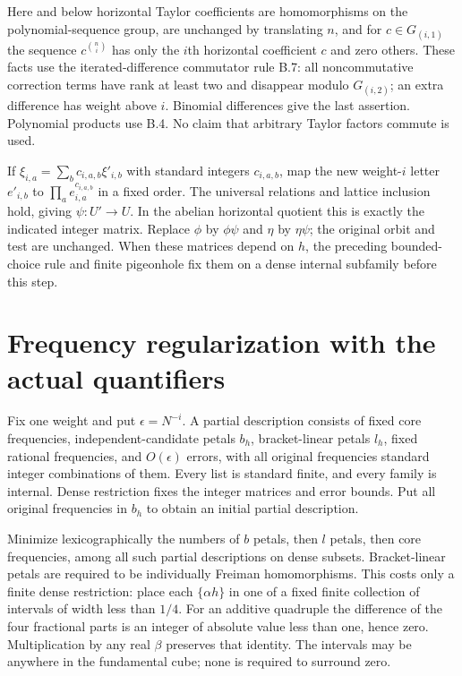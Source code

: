 \documentclass[11pt]{article}
\begin{document}
Here and below horizontal Taylor coefficients are homomorphisms on the
polynomial-sequence group, are unchanged by translating $n$, and for
$c\in G_{(i,1)}$ the sequence $c^{\binom ni}$ has only the $i$th horizontal
coefficient $c$ and zero others. These facts use the iterated-difference
commutator rule B.7: all noncommutative correction terms have rank at least
two and disappear modulo $G_{(i,2)}$; an extra difference has weight above
$i$. Binomial differences give the last assertion. Polynomial products use
B.4. No claim that arbitrary Taylor factors commute is used.

If $\xi_{i,a}=\sum_b c_{i,a,b}\xi'_{i,b}$ with standard integers $c_{i,a,b}$,
map the new weight-$i$ letter $e'_{i,b}$ to
$\prod_a e_{i,a}^{c_{i,a,b}}$ in a fixed order. The universal relations and
lattice inclusion hold, giving $\psi:U'\to U$. In the abelian horizontal
quotient this is exactly the indicated integer matrix. Replace $\phi$ by
$\phi\psi$ and $\eta$ by $\eta\psi$; the original orbit and test are unchanged.
When these matrices depend on $h$, the preceding bounded-choice rule and
finite pigeonhole fix them on a dense internal subfamily before this step.

\section{Frequency regularization with the actual quantifiers}
Fix one weight and put $\epsilon=N^{-i}$. A partial description consists of
fixed core frequencies, independent-candidate petals $b_h$, bracket-linear
petals $l_h$, fixed rational frequencies, and $O(\epsilon)$ errors, with all
original frequencies standard integer combinations of them. Every list is
standard finite, and every family is internal. Dense restriction fixes the
integer matrices and error bounds. Put all original frequencies in $b_h$
to obtain an initial partial description.

Minimize lexicographically the numbers of $b$ petals, then $l$ petals,
then core frequencies, among all such partial descriptions on dense
subsets. Bracket-linear petals are required to be individually Freiman
homomorphisms. This costs only a finite dense restriction: place each
$\{\alpha h\}$ in one of a fixed finite collection of intervals of width
less than $1/4$. For an additive quadruple the difference of the four
fractional parts is an integer of absolute value less than one, hence zero.
Multiplication by any real $\beta$ preserves that identity. The intervals
may be anywhere in the fundamental cube; none is required to surround zero.
\end{document}
